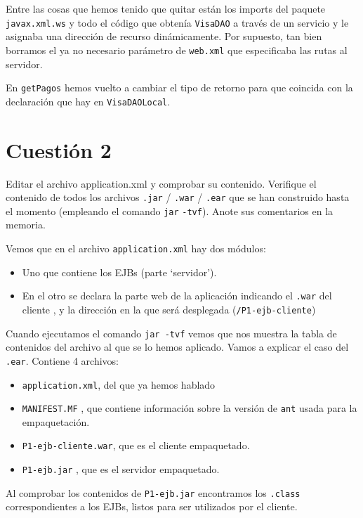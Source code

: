 \documentclass[a4paper, 10pt]{article}
\begin{document}
	Entre las cosas que hemos tenido que quitar están los imports del paquete \texttt{javax.xml.ws} y todo el código que obtenía \texttt{VisaDAO} a través de un servicio y le asignaba una dirección de recurso dinámicamente. Por supuesto, tan bien borramos el ya no necesario parámetro de \texttt{web.xml} que especificaba las rutas al servidor.

	En \texttt{getPagos} hemos vuelto a cambiar el tipo de retorno para que coincida con la declaración que hay en \texttt{VisaDAOLocal}.




\section{Cuestión 2}
\begin{mdframed}
 Editar el archivo application.xml y comprobar su contenido. Verifique el contenido de todos los
archivos \texttt{.jar} / \texttt{.war} / \texttt{.ear} que se han construido hasta el momento (empleando el comando \texttt{jar} \texttt{-tvf}). Anote
sus comentarios en la memoria.
\end{mdframed}
	Vemos que en el archivo \texttt{application.xml} hay dos módulos:
	\begin{itemize}
		\item Uno que contiene los EJBs (parte `servidor').
		\item En el otro se declara la parte web de la aplicación indicando el \texttt{.war} del cliente , y la dirección en la que será desplegada (\texttt{/P1-ejb-cliente})
	 \end{itemize}
	 
	 Cuando ejecutamos el comando \texttt{jar -tvf} vemos que nos muestra la tabla de contenidos del archivo al que se lo hemos aplicado. Vamos a explicar el caso del \texttt{.ear}. Contiene 4 archivos:

	 \begin{itemize}
	 	\item \texttt{application.xml}, del que ya hemos hablado
	 	\item \texttt{MANIFEST.MF} , que contiene información sobre la versión de \texttt{ant} usada para la empaquetación.
	 	\item \texttt{P1-ejb-cliente.war}, que es el cliente empaquetado.
	 	\item \texttt{P1-ejb.jar} , que es el servidor empaquetado.
	 \end{itemize} 

	 Al comprobar los contenidos de \texttt{P1-ejb.jar} encontramos los \texttt{.class} correspondientes a los EJBs, listos para ser utilizados por el cliente.
\end{document}
